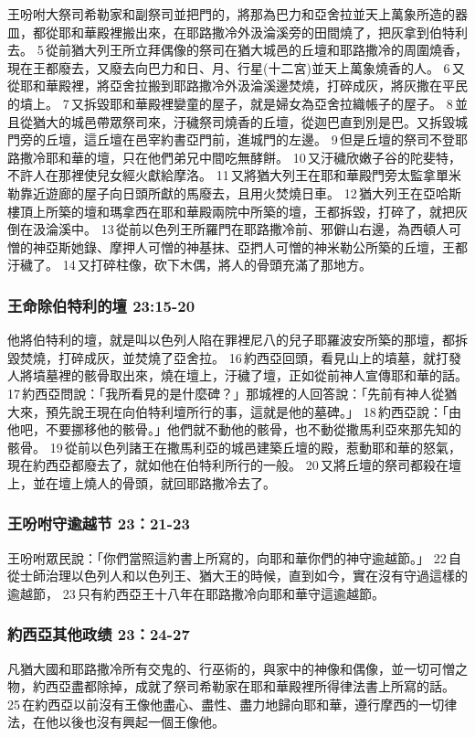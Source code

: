 王吩咐大祭司希勒家和副祭司並把門的，將那為巴力和亞舍拉並天上萬象所造的器皿，都從耶和華殿裡搬出來，在耶路撒冷外汲淪溪旁的田間燒了，把灰拿到伯特利去。 5 從前猶大列王所立拜偶像的祭司在猶大城邑的丘壇和耶路撒冷的周圍燒香，現在王都廢去，又廢去向巴力和日、月、行星(十二宮)並天上萬象燒香的人。 6 又從耶和華殿裡，將亞舍拉搬到耶路撒冷外汲淪溪邊焚燒，打碎成灰，將灰撒在平民的墳上。 7 又拆毀耶和華殿裡孌童的屋子，就是婦女為亞舍拉織帳子的屋子。 8 並且從猶大的城邑帶眾祭司來，汙穢祭司燒香的丘壇，從迦巴直到別是巴。又拆毀城門旁的丘壇，這丘壇在邑宰約書亞門前，進城門的左邊。 9 但是丘壇的祭司不登耶路撒冷耶和華的壇，只在他們弟兄中間吃無酵餅。 10 又汙穢欣嫩子谷的陀斐特，不許人在那裡使兒女經火獻給摩洛。 11 又將猶大列王在耶和華殿門旁太監拿單米勒靠近遊廊的屋子向日頭所獻的馬廢去，且用火焚燒日車。 12 猶大列王在亞哈斯樓頂上所築的壇和瑪拿西在耶和華殿兩院中所築的壇，王都拆毀，打碎了，就把灰倒在汲淪溪中。 13 從前以色列王所羅門在耶路撒冷前、邪僻山右邊，為西頓人可憎的神亞斯她錄、摩押人可憎的神基抹、亞捫人可憎的神米勒公所築的丘壇，王都汙穢了。 14 又打碎柱像，砍下木偶，將人的骨頭充滿了那地方。

\subsubsection{王命除伯特利的壇 23:15-20}
他將伯特利的壇，就是叫以色列人陷在罪裡尼八的兒子耶羅波安所築的那壇，都拆毀焚燒，打碎成灰，並焚燒了亞舍拉。 16 約西亞回頭，看見山上的墳墓，就打發人將墳墓裡的骸骨取出來，燒在壇上，汙穢了壇，正如從前神人宣傳耶和華的話。 17 約西亞問說：「我所看見的是什麼碑？」那城裡的人回答說：「先前有神人從猶大來，預先說王現在向伯特利壇所行的事，這就是他的墓碑。」 18 約西亞說：「由他吧，不要挪移他的骸骨。」他們就不動他的骸骨，也不動從撒馬利亞來那先知的骸骨。 19 從前以色列諸王在撒馬利亞的城邑建築丘壇的殿，惹動耶和華的怒氣，現在約西亞都廢去了，就如他在伯特利所行的一般。 20 又將丘壇的祭司都殺在壇上，並在壇上燒人的骨頭，就回耶路撒冷去了。


\subsubsection{王吩咐守逾越节 23：21-23}
王吩咐眾民說：「你們當照這約書上所寫的，向耶和華你們的神守逾越節。」 22 自從士師治理以色列人和以色列王、猶大王的時候，直到如今，實在沒有守過這樣的逾越節， 23 只有約西亞王十八年在耶路撒冷向耶和華守這逾越節。

\subsubsection{約西亞其他政绩 23：24-27}
凡猶大國和耶路撒冷所有交鬼的、行巫術的，與家中的神像和偶像，並一切可憎之物，約西亞盡都除掉，成就了祭司希勒家在耶和華殿裡所得律法書上所寫的話。 25 在約西亞以前沒有王像他盡心、盡性、盡力地歸向耶和華，遵行摩西的一切律法，在他以後也沒有興起一個王像他。


